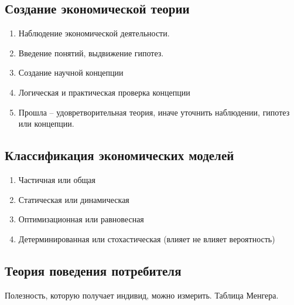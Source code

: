 \documentclass[14pt]{extarticle}
\begin{document}
    \subsection{Создание экономической теории}
    \begin{enumerate}
        \item Наблюдение экономической деятельности.
        \item Введение понятий, выдвижение гипотез.
        \item Создание научной концепции
        \item Логическая и практическая проверка концепции
        \item Прошла -- удовретворительная теория, иначе уточнить наблюдении, гипотез или концепции.
    \end{enumerate}
    \subsection{Классификация экономических моделей}
    \begin{enumerate}
        \item Частичная или общая
        \item Статическая или динамическая
        \item Оптимизационная или равновесная
        \item Детерминированная или стохастическая (влияет не влияет вероятность)
    \end{enumerate}
    \subsection{Теория поведения потребителя}
    Полезность, которую получает индивид, можно измерить.
    Таблица Менгера.
\end{document}
